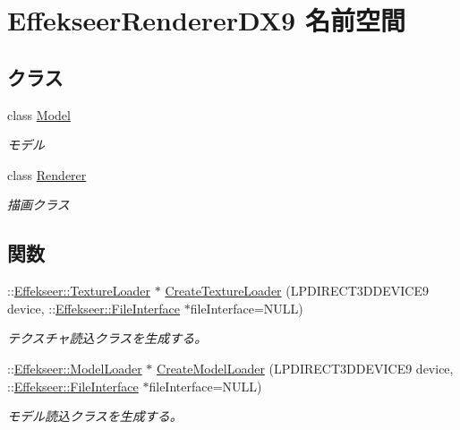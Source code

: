 \hypertarget{namespace_effekseer_renderer_d_x9}{}\section{Effekseer\+Renderer\+D\+X9 名前空間}
\label{namespace_effekseer_renderer_d_x9}
\subsection*{クラス}
\begin{DoxyCompactItemize}
\item 
class \mbox{\hyperlink{class_effekseer_renderer_d_x9_1_1_model}{Model}}
\begin{DoxyCompactList}\small\item\em モデル \end{DoxyCompactList}\item 
class \mbox{\hyperlink{class_effekseer_renderer_d_x9_1_1_renderer}{Renderer}}
\begin{DoxyCompactList}\small\item\em 描画クラス \end{DoxyCompactList}\end{DoxyCompactItemize}
\subsection*{関数}
\begin{DoxyCompactItemize}
\item 
\+::\mbox{\hyperlink{class_effekseer_1_1_texture_loader}{Effekseer\+::\+Texture\+Loader}} $\ast$ \mbox{\hyperlink{namespace_effekseer_renderer_d_x9_a89d8f828f46e0eb46094b96203a6f7d4}{Create\+Texture\+Loader}} (L\+P\+D\+I\+R\+E\+C\+T3\+D\+D\+E\+V\+I\+C\+E9 device, \+::\mbox{\hyperlink{class_effekseer_1_1_file_interface}{Effekseer\+::\+File\+Interface}} $\ast$file\+Interface=N\+U\+LL)
\begin{DoxyCompactList}\small\item\em テクスチャ読込クラスを生成する。 \end{DoxyCompactList}\item 
\+::\mbox{\hyperlink{class_effekseer_1_1_model_loader}{Effekseer\+::\+Model\+Loader}} $\ast$ \mbox{\hyperlink{namespace_effekseer_renderer_d_x9_a496d0398b86f68f4010efa58df8c264a}{Create\+Model\+Loader}} (L\+P\+D\+I\+R\+E\+C\+T3\+D\+D\+E\+V\+I\+C\+E9 device, \+::\mbox{\hyperlink{class_effekseer_1_1_file_interface}{Effekseer\+::\+File\+Interface}} $\ast$file\+Interface=N\+U\+LL)
\begin{DoxyCompactList}\small\item\em モデル読込クラスを生成する。 \end{DoxyCompactList}\end{DoxyCompactItemize}


